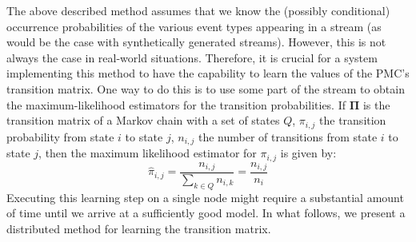 The above described method assumes that we know the (possibly conditional) occurrence probabilities of the various event types appearing in a stream
(as would be the case with synthetically generated streams).
However, this is not always the case in real-world situations.
Therefore, it is crucial for a system implementing this method to have the capability to learn the values of the PMC's transition matrix.
One way to do this is to use some part of the stream to obtain the maximum-likelihood estimators for the transition probabilities. 
If $\boldsymbol{\Pi}$ is the transition matrix of a Markov chain with a set of states $Q$, 
$\pi_{i,j}$ the transition probability from state $i$ to state $j$,
$n_{i,j}$ the number of transitions from state $i$ to state $j$,
then the maximum likelihood estimator for $\pi_{i,j}$ is given by:
\begin{equation*}
\label{eq:pi_estim}
\hat{\pi}_{i,j}=\frac{n_{i,j}}{\sum_{k \in Q} n_{i,k}}=\frac{n_{i,j}}{n_{i}}
\end{equation*}
Executing this learning step on a single node might require a substantial amount of time until we arrive at a sufficiently good model.
In what follows, we present a distributed method for learning the transition matrix.
